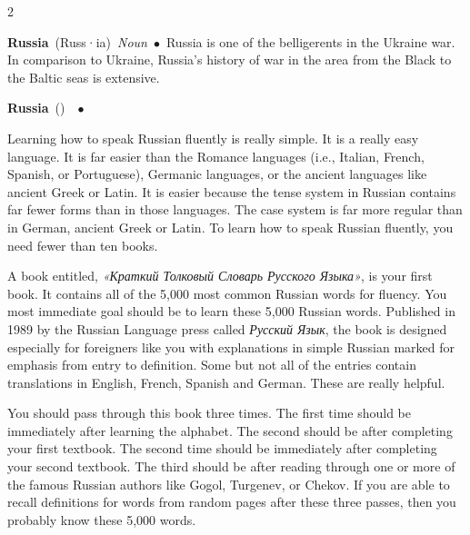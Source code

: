 \documentclass[10pt,a4paper,twoside]{article} %
\newcommand{\entry}[4]{\markboth{#1}{#1}\textbf{#1}\ {(#2)}\ \textit{#3}\ $\bullet$\ {#4}}  %
\begin{document}
\begin{multicols}{2}
\entry{Russia} {Russ·ia} {Noun} {Russia is one of the belligerents in the Ukraine war. In comparison to Ukraine, Russia's history of war in the area from the Black to the Baltic seas is extensive. 
}

\entry{Russia} {} {} {Learning how to speak Russian fluently is really simple. It is a really easy language. It is far easier than the Romance languages (i.e., Italian, French, Spanish, or Portuguese), Germanic languages, or the ancient languages like ancient Greek or Latin. It is easier because the tense system in Russian contains far fewer forms than in those languages. The case system is far more regular than in German, ancient Greek or Latin. To learn how to speak Russian fluently, you need fewer than ten books.

\newline \indent A book entitled, \textrussian{\emph{«Краткий Толковый Словарь Русского Языка»}}, is your first book. It contains all of the 5,000 most common Russian words for fluency. You most immediate goal should be to learn these 5,000 Russian words. Published in 1989 by the Russian Language press called \textrussian{\emph{Русский Язык}}, the book is designed especially for foreigners like you with explanations in simple Russian marked for emphasis from entry to definition. Some but not all of the entries contain translations in English, French, Spanish and German. These are really helpful. 

\newline \indent You should pass through this book three times. The first time should be immediately after learning the alphabet. The second should be after completing your first textbook. The second time should be immediately after completing your second textbook. The third should be after reading through one or more of the famous Russian authors like Gogol, Turgenev, or Chekov. If you are able to recall definitions for words from random pages after these three passes, then you probably know these 5,000 words.

}
\end{multicols}
\end{document}
